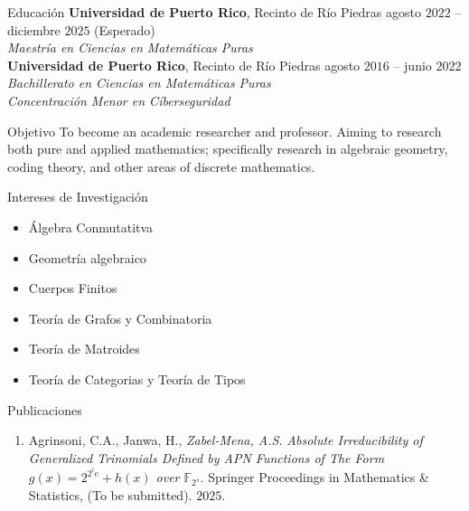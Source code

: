 \documentclass{resume}
\begin{document}
\begin{rSection}{Educaci\'on}
  \textbf{Universidad de Puerto Rico}, Recinto de R\'io Piedras
  \hfill agosto $2022$ -- diciembre $2025$ (Esperado)  \\
  \textit{Maestr\'ia en Ciencias en Matem\'aticas Puras} \\

  \textbf{Universidad de Puerto Rico}, Recinto de R\'io Piedras
  \hfill agosto $2016$ -- junio $2022$  \\
  \textit{Bachillerato en Ciencias en Matem\'aticas Puras}  \\
  \textit{Concentraci\'on Menor en C\'iberseguridad}
\end{rSection}

\begin{rSection}{Objetivo}
  To become an academic researcher and professor. Aiming to research both pure
  and applied mathematics; specifically research in algebraic
  geometry, coding theory, and other areas of discrete mathematics.
\end{rSection}

\begin{rSection}{Intereses de Investigaci\'on}
  \begin{multicols}{2}
    \begin{itemize}
      \item \'Algebra Conmutatitva

      \item Geometr\'ia algebraico

      \item Cuerpos Finitos

      \item Teor\'ia de Grafos y Combinatoria

      \item Teor\'ia de Matroides

      \item Teor\'ia de Categorias y Teor\'ia de Tipos
    \end{itemize}
  \end{multicols}
\end{rSection}


\begin{rSection}{Publicaciones}
  \begin{enumerate}
    \item Agrinsoni, C.A., Janwa, H., \textit{Zabel-Mena, A.S.}
      \textit{Absolute Irreducibility of Generalized
        Trinomials Defined by APN Functions of The Form
      $g(x)=2^{2^ie}+h(x)$ over $\mathbb{F}_{2^s}$}. Springer
      Proceedings in Mathematics \& Statistics, (To be submitted).
      $2025$.
  \end{enumerate}
\end{rSection}
\end{document}

